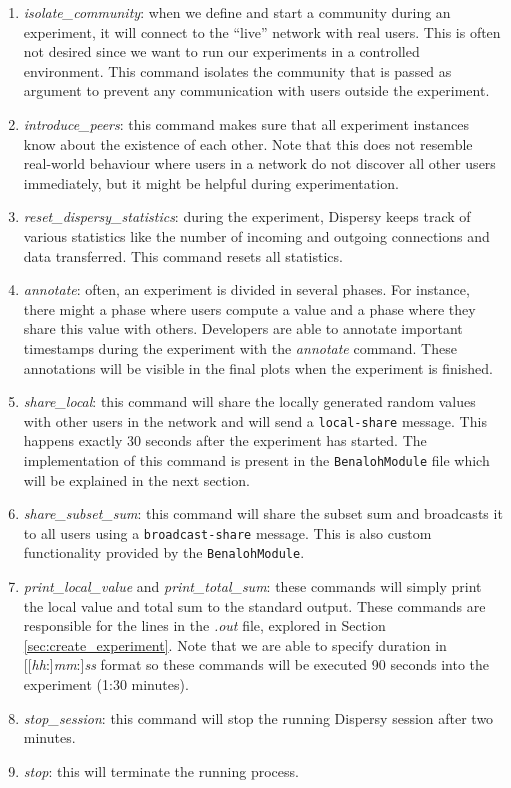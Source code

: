 \documentclass{article}
\begin{document}
\begin{enumerate}
	\item \emph{isolate\_community}: when we define and start a community during an experiment, it will connect to the \enquote{live} network with real users. This is often not desired since we want to run our experiments in a controlled environment. This command isolates the community that is passed as argument to prevent any communication with users outside the experiment.
	\item \emph{introduce\_peers}: this command makes sure that all experiment instances know about the existence of each other. Note that this does not resemble real-world behaviour where users in a network do not discover all other users immediately, but it might be helpful during experimentation.
	\item \emph{reset\_dispersy\_statistics}: during the experiment, Dispersy keeps track of various statistics like the number of incoming and outgoing connections and data transferred. This command resets all statistics.
	\item \emph{annotate}: often, an experiment is divided in several phases. For instance, there might a phase where users compute a value and a phase where they share this value with others. Developers are able to annotate important timestamps during the experiment with the \emph{annotate} command. These annotations will be visible in the final plots when the experiment is finished.
	\item \emph{share\_local}: this command will share the locally generated random values with other users in the network and will send a \texttt{local-share} message. This happens exactly 30 seconds after the experiment has started. The implementation of this command is present in the \texttt{BenalohModule} file which will be explained in the next section.
	\item \emph{share\_subset\_sum}: this command will share the subset sum and broadcasts it to all users using a \texttt{broadcast-share} message. This is also custom functionality provided by the \texttt{BenalohModule}.
	\item \emph{print\_local\_value} and \emph{print\_total\_sum}: these commands will simply print the local value and total sum to the standard output. These commands are responsible for the lines in the \emph{.out} file, explored in Section \ref{sec:create_experiment}. Note that we are able to specify duration in [[\emph{hh}:]\emph{mm}:]\emph{ss} format so these commands will be executed 90 seconds into the experiment (1:30 minutes).
	\item \emph{stop\_session}: this command will stop the running Dispersy session after two minutes.
	\item \emph{stop}: this will terminate the running process.
\end{enumerate}
\end{document}
